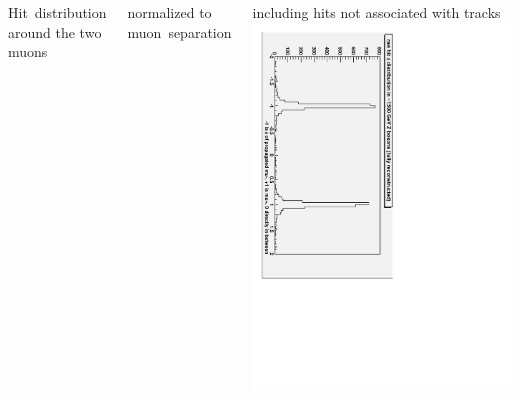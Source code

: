 \documentclass[compress]{beamer}
\begin{document}
\begin{frame}
\begin{columns}
\mbox{Hit distribution\hspace{-0.5 cm}} around the two muons

\vspace{0.2 cm}
normalized to \mbox{muon separation\hspace{-0.5 cm}}

\vspace{0.2 cm}
including hits not associated with tracks
\includegraphics[height=\linewidth, angle=90]{hit_distribution_from_muons.pdf}
\end{columns}
\end{frame}

\end{document}
